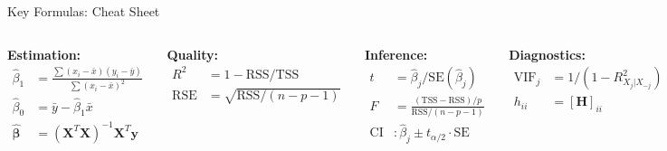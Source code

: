 \documentclass[aspectratio=169, 11pt]{beamer}
\begin{document}
\begin{frame}{Key Formulas: Cheat Sheet}
\begin{columns}
\textbf{Estimation:}
\begin{align*}
\hat{\beta}_1 &= \frac{\sum(x_i - \bar{x})(y_i - \bar{y})}{\sum(x_i - \bar{x})^2} \\[4pt]
\hat{\beta}_0 &= \bar{y} - \hat{\beta}_1 \bar{x} \\[4pt]
\hat{\boldsymbol{\beta}} &= (\mathbf{X}^T\mathbf{X})^{-1}\mathbf{X}^T\mathbf{y}
\end{align*}

\textbf{Quality:}
\begin{align*}
R^2 &= 1 - \text{RSS}/\text{TSS} \\
\text{RSE} &= \sqrt{\text{RSS}/(n-p-1)}
\end{align*}

\textbf{Inference:}
\begin{align*}
t &= \hat{\beta}_j / \text{SE}(\hat{\beta}_j) \\[4pt]
F &= \frac{(\text{TSS}-\text{RSS})/p}{\text{RSS}/(n-p-1)} \\[4pt]
\text{CI} &: \hat{\beta}_j \pm t_{\alpha/2} \cdot \text{SE}
\end{align*}

\textbf{Diagnostics:}
\begin{align*}
\text{VIF}_j &= 1/(1 - R^2_{X_j|X_{-j}}) \\
h_{ii} &= [\mathbf{H}]_{ii}
\end{align*}
\end{columns}
\end{frame}


\end{document}
